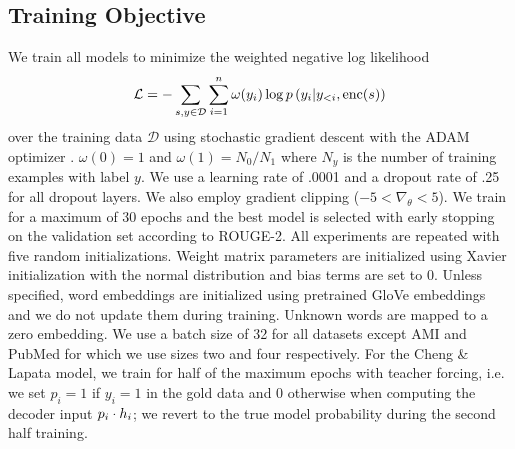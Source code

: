 
\subsection{Training Objective}


We train all models to minimize the weighted negative log likelihood
\[\mathcal{L} = -\sum_{s,y\in \mathcal{D}} \sum_{i=1}^\docSize \omega(y_i) \log p\left(y_i|y_{<i},
\operatorname{enc}(\sent)\right)\]
over the training data $\mathcal{D}$
using stochastic gradient descent with the ADAM optimizer
\cite{kingma2014adam}.
$\omega(0)=1$ and $\omega(1) = N_0/N_1$ where $N_y$ is the number of 
training examples with label $y$.
    We use a learning rate of .0001 and a dropout rate of .25 for all dropout
    layers. We also employ gradient clipping ($-5 < \nabla_\theta < 5$).
    We train for a maximum of 30 epochs and the best
    model is selected with early stopping on the validation set according
    to ROUGE-2. All experiments are repeated with five random
    initializations. Weight matrix parameters are initialized using 
    Xavier initialization with the normal distribution 
    \cite{glorot2010understanding} and bias terms are set to 0.
    Unless specified, word embeddings are initialized 
    using pretrained GloVe embeddings \cite{pennington2014glove} and we do 
    not update them during training. Unknown words are mapped to a zero 
    embedding.
    We use a batch size of 32 for all datasets except AMI and PubMed for
    which we use sizes two and four respectively. 
    For the Cheng \& Lapata model, we train for half of the maximum epochs 
    with teacher forcing, i.e. we set $p_i = 1$
    if $y_i = 1$ in the gold data and 0 otherwise 
    when computing the decoder input 
    $p_i \cdot \sentEmb[i]$; we revert to the true model probability 
    during the second half training.


